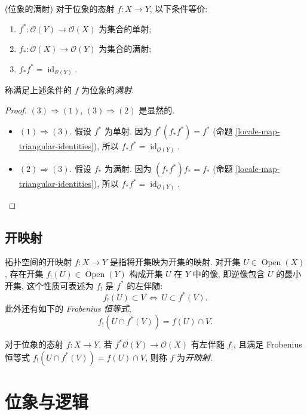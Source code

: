 \begin{propdef}
	{(位象的满射)}
	对于位象的态射 $f\colon X\to Y$, 以下条件等价:
	\begin{enumerate}[(1)]
		\item $f^*\colon \mathcal O(Y)\to\mathcal O(X)$ 为集合的单射;
		\item $f_*\colon \mathcal O(X)\to\mathcal O(Y)$ 为集合的满射;
		\item $f_*f^* = \operatorname{id}_{\mathcal O(Y)}$.
	\end{enumerate}
	称满足上述条件的 $f$ 为位象的\emph{满射}.
\end{propdef}
\begin{proof}
	$(3)\Rightarrow (1)$, $(3)\Rightarrow (2)$ 是显然的.
	\begin{itemize}
		\item $(1)\Rightarrow (3)$. 假设 $f^*$ 为单射. 因为 $f^*(f_*f^*) = f^*$ (命题 \ref{locale-map-triangular-identities}), 所以 $f_*f^*=\operatorname{id}_{\mathcal O(Y)}$.
		\item $(2)\Rightarrow (3)$. 假设 $f_*$ 为满射. 因为 $(f_*f^*)f_* = f_*$ (命题 \ref{locale-map-triangular-identities}), 所以 $f_*f^*=\operatorname{id}_{\mathcal O(Y)}$.
	\end{itemize}
\end{proof}

\subsection{开映射}


拓扑空间的开映射 $f\colon X\to Y$ 是指将开集映为开集的映射. 对开集 $U\in\operatorname{Open}(X)$, 存在开集
$f_!(U) \in \operatorname{Open}(Y)$ 构成开集 $U$ 在 $Y$ 中的像, 即逆像包含 $U$ 的最小开集, 这个性质可表述为 $f_!$ 是 $f^*$ 的左伴随:
\[
f_!(U) \subset V \,\Leftrightarrow\, U\subset f^*(V).
\]
此外还有如下的 \emph{Frobenius 恒等式},
\[
f_!(U\cap f^*(V)) = f(U)\cap V.
\]

\begin{definition}
	{}
	对于位象的态射 $f\colon X\to Y$, 若 $f^*\mathcal O(Y)\to \mathcal O(X)$ 有左伴随 $f_!$, 且满足 Frobenius 恒等式 $f_!(U\cap f^*(V)) = f(U)\cap V$, 则称 $f$ 为\emph{开映射}.
\end{definition}



\section{位象与逻辑}

